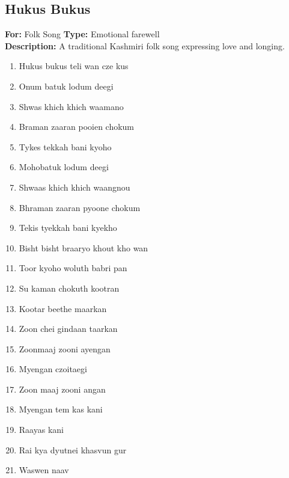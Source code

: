 \documentclass[12pt]{article}
\newcommand{\bigroman}[1]{\fontsize{16pt}{18pt}\selectfont\RaggedRight #1}
\begin{document}
\begin{multicols}{2}
\subsection*{Hukus Bukus}
\textbf{For:} Folk Song \quad \textbf{Type:} Emotional farewell\\
\textbf{Description:} A traditional Kashmiri folk song expressing love and longing.

\begin{multicols}{2}
\begin{enumerate}[leftmargin=*, label=\arabic*., font=\fontsize{16pt}{18pt}\selectfont]
  \item \bigroman{Hukus bukus teli wan cze kus}
  \item \bigroman{Onum batuk lodum deegi}
  \item \bigroman{Shwas khich khich waamano}
  \item \bigroman{Braman zaaran pooien chokum}
  \item \bigroman{Tykes tekkah bani kyoho}
  \item \bigroman{Mohobatuk lodum deegi}
  \item \bigroman{Shwaas khich khich waangnou}
  \item \bigroman{Bhraman zaaran pyoone chokum}
  \item \bigroman{Tekis tyekkah bani kyekho}
  \item \bigroman{Bisht bisht braaryo khout kho wan}
  \item \bigroman{Toor kyoho woluth babri pan}
  \item \bigroman{Su kaman chokuth kootran}
  \item \bigroman{Kootar beethe maarkan}
  \item \bigroman{Zoon chei gindaan taarkan}
  \item \bigroman{Zoonmaaj zooni ayengan}
  \item \bigroman{Myengan czoitaegi}
  \item \bigroman{Zoon maaj zooni angan}
  \item \bigroman{Myengan tem kas kani}
  \item \bigroman{Raayas kani}
  \item \bigroman{Rai kya dyutnei khasvun gur}
  \item \bigroman{Waswen naav}
\end{enumerate}

\columnbreak


\end{multicols}
\end{multicols}
\end{document}
